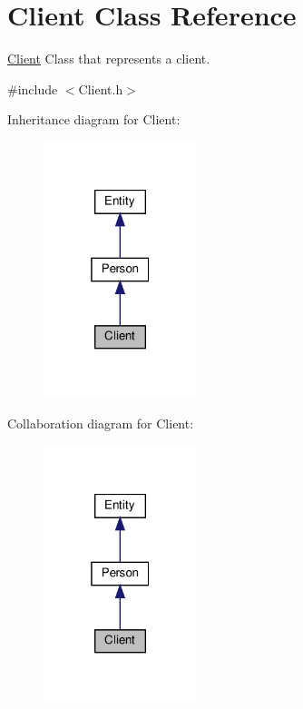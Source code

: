 \hypertarget{classClient}{}\section{Client Class Reference}
\label{classClient}


\hyperlink{classClient}{Client} Class that represents a client.  




{\ttfamily \#include $<$Client.\+h$>$}



Inheritance diagram for Client\+:\nopagebreak
\begin{figure}[H]
\begin{center}
\leavevmode
\includegraphics[width=127pt]{classClient__inherit__graph}
\end{center}
\end{figure}


Collaboration diagram for Client\+:\nopagebreak
\begin{figure}[H]
\begin{center}
\leavevmode
\includegraphics[width=127pt]{classClient__coll__graph}
\end{center}
\end{figure}
